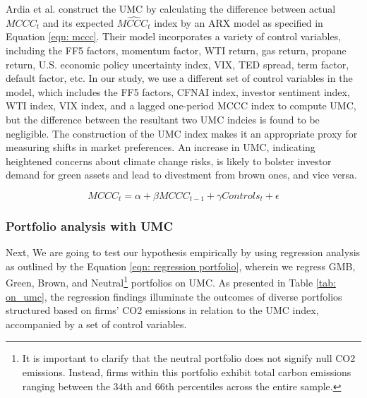 \documentclass[12pt]{article}
\begin{document}
Ardia et al. construct the UMC by calculating the difference between actual $MCCC_t$ and its expected $\widehat{MCCC_t}$ index by an ARX model as specified in Equation \ref{eqn: mccc}. Their model incorporates a variety of control variables, including the FF5 factors, momentum factor, WTI return, gas return, propane return, U.S. economic policy uncertainty index, VIX, TED spread, term factor, default factor, etc. In our study, we use a different set of control variables in the model, which includes the FF5 factors, CFNAI index, investor sentiment index, WTI index, VIX index, and a lagged one-period MCCC index to compute UMC, but the difference between the resultant two UMC indcies is found to be negligible. The construction of the UMC index makes it an appropriate proxy for measuring shifts in market preferences. An increase in UMC, indicating heightened concerns about climate change risks, is likely to bolster investor demand for green assets and lead to divestment from brown ones, and vice versa.

\begin{equation}
\label{eqn: mccc}
MCCC_t = \alpha + \beta MCCC_{t-1} + \gamma Controls_{t} + \epsilon
\end{equation}

\subsubsection{Portfolio analysis with UMC}

Next, We are going to test our hypothesis empirically by using regression analysis as outlined by the Equation \ref{eqn: regression portfolio}, wherein we regress GMB, Green, Brown, and Neutral\footnote{It is important to clarify that the neutral portfolio does not signify null CO2 emissions. Instead, firms within this portfolio exhibit total carbon emissions ranging between the 34th and 66th percentiles across the entire sample.} portfolios on UMC. As presented in Table \ref{tab: on_umc}, the regression findings illuminate the outcomes of diverse portfolios structured based on firms' CO2 emissions in relation to the UMC index, accompanied by a set of control variables. 
\end{document}

